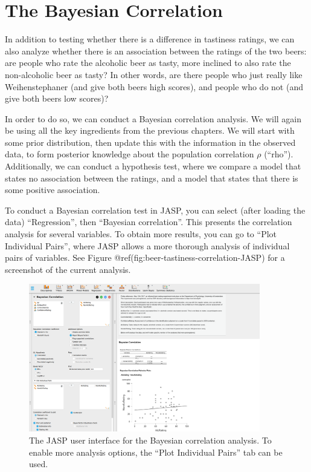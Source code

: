 \documentclass[
  letterpaper,
  DIV=11,
  numbers=noendperiod]{scrreprt}
\begin{document}
\hypertarget{the-bayesian-correlation}{%
\section{The Bayesian Correlation}\label{the-bayesian-correlation}}

In addition to testing whether there is a difference in tastiness
ratings, we can also analyze whether there is an association between the
ratings of the two beers: are people who rate the alcoholic beer as
tasty, more inclined to also rate the non-alcoholic beer as tasty? In
other words, are there people who just really like Weihenstephaner (and
give both beers high scores), and people who do not (and give both beers
low scores)?

In order to do so, we can conduct a Bayesian correlation analysis. We
will again be using all the key ingredients from the previous chapters.
We will start with some prior distribution, then update this with the
information in the observed data, to form posterior knowledge about the
population correlation \(\rho\) (``rho''). Additionally, we can conduct
a hypothesis test, where we compare a model that states no association
between the ratings, and a model that states that there is some positive
association.

To conduct a Bayesian correlation test in JASP, you can select (after
loading the data) ``Regression'', then ``Bayesian correlation''. This
presents the correlation analysis for several variables. To obtain more
results, you can go to ``Plot Individual Pairs'', where JASP allows a
more thorough analysis of individual pairs of variables. See Figure
@ref(fig:beer-tastiness-correlation-JASP) for a screenshot of the
current analysis.

\begin{figure}

{\centering \includegraphics[width=0.9\textwidth,height=\textheight]{Figures/correlationTestJASPpanel2022.png}

}

\caption{The JASP user interface for the Bayesian correlation analysis.
To enable more analysis options, the ``Plot Individual Pairs'' tab can
be used.}

\end{figure}
\end{document}
